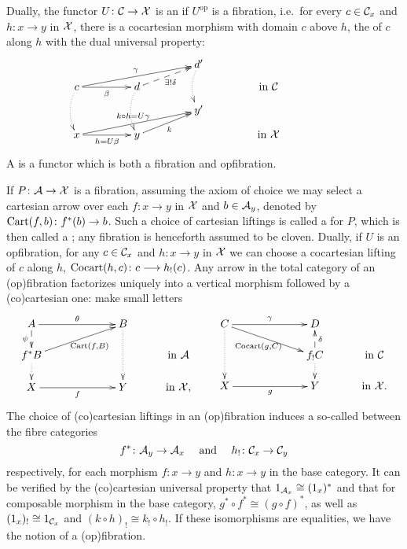 \documentclass{amsart}
\begin{document}
Dually, the functor $U \colon \mathcal{C} \to \mathcal{X}$ is an  if $U^\mathrm{op}$ is a fibration, i.e.\ for every $c \in \mathcal{C} _x$ and $h \colon x \to y$ in $\mathcal{X}$, there is a cocartesian morphism with domain $c$ above $h$, the  of $c$ along $h$ with the dual universal property:
\begin{equation}\label{eq:opfibration}
\xymatrix @R=.1in @C=.6in
{&& d'\ar @{.>}@/_/[dd] &&\\
c\ar[r]_-{\beta} \ar @{.>}@/_/[dd]
\ar[urr]^-{\gamma} & 
d \ar @{.>}@/_/[dd] \ar @{-->}[ur]_-{\exists! \delta}
&& \textrm{in }\C\\
&& y' &&\\
x\ar[r]_-{h=U\beta} \ar[urr]^-{k\circ h=U\gamma}
 & y \ar[ur]_-k && \textrm{in }\X}
\end{equation}
A  is a functor which is both a fibration and opfibration.

If $P\colon \mathcal{A} \to\mathcal{X}$ is a fibration, assuming the axiom of choice we may select a cartesian arrow over each $f\colon x\to y$ in $\mathcal{X}$ and $b\in\mathcal{A} _y$, denoted by $\mathrm{Cart}(f,b)\colon f^*(b)\to b$. Such a choice of cartesian liftings is called a  for $P$, which is then called a ; any fibration is henceforth assumed to be cloven. Dually, if $U$ is an opfibration, for any $c\in\mathcal{C} _x$ and $h \colon x \to y$ in $\mathcal{X}$ we can choose a cocartesian lifting of $c$ along $h$, $\mathrm{Cocart}(h,c)\colon c\longrightarrow h_!(c)$. 
Any arrow in the total category of an (op)fibration factorizes uniquely into
a vertical morphism followed by a (co)cartesian one: {\chris make small letters}
\begin{equation}\label{factor}
\xymatrix @C=.4in @R=.2in
{A\ar[rr]^\theta\ar @{-->}[d]_-{\psi} && B \ar @{.>}[dd] &\\
f^*B\ar[urr]_-{\;\Cart(f,B)} \ar @{.>}[d] &&& \textrm{in }\A  \\
X\ar[rr]_-{f} && Y & \textrm{in }\X,}\qquad
\xymatrix @C=.4in @R=.2in
{C \ar @{.>}[dd]\ar[rr]^\gamma \ar[drr]_-{\Cocart(g,C)} && D &\\
&& f_!C \ar @{-->}[u]_-{\delta} \ar @{.>}[d] & \textrm{in }\C  \\
X\ar[rr]_-{g} && Y & \textrm{in }\X.}
\end{equation}
The choice of (co)cartesian liftings in an (op)fibration induces a so-called  between the fibre categories
\begin{equation}\label{reindexing}
    f^*\colon \mathcal{A} _y\to\mathcal{A} _x\quad\textrm{ and }\quad h_!\colon\mathcal{C} _x\to\mathcal{C} _y
\end{equation}
respectively, for each morphism $f\colon x\to y$ and $h\colon x\to y$ in the base category.
It can be verified by the (co)cartesian universal property that $1_{\mathcal{A} _x}\cong(1_x)^*$ 
and that for composable morphism in the base category, $g^*\circ f^*\cong(g\circ f)^* $, as well as $(1_x)_!\cong1_{\mathcal{C}_x}$ and $(k\circ h)_!\cong k_!\circ h_!$. If these isomorphisms are equalities, we have the notion of a  (op)fibration.
\end{document}
